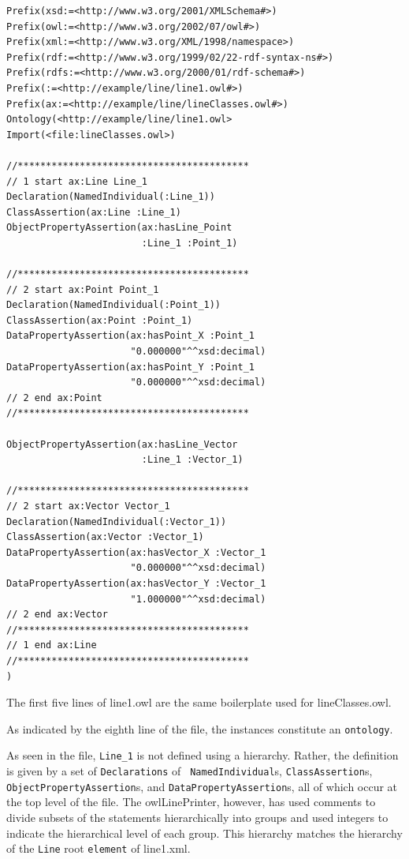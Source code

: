 \documentclass[preprint,12pt]{elsarticle}
\begin{document}
\begin{verbatim}
Prefix(xsd:=<http://www.w3.org/2001/XMLSchema#>)
Prefix(owl:=<http://www.w3.org/2002/07/owl#>)
Prefix(xml:=<http://www.w3.org/XML/1998/namespace>)
Prefix(rdf:=<http://www.w3.org/1999/02/22-rdf-syntax-ns#>)
Prefix(rdfs:=<http://www.w3.org/2000/01/rdf-schema#>)
Prefix(:=<http://example/line/line1.owl#>)
Prefix(ax:=<http://example/line/lineClasses.owl#>)
Ontology(<http://example/line/line1.owl>
Import(<file:lineClasses.owl>)

//*****************************************
// 1 start ax:Line Line_1
Declaration(NamedIndividual(:Line_1))
ClassAssertion(ax:Line :Line_1)
ObjectPropertyAssertion(ax:hasLine_Point
                        :Line_1 :Point_1)

//*****************************************
// 2 start ax:Point Point_1
Declaration(NamedIndividual(:Point_1))
ClassAssertion(ax:Point :Point_1)
DataPropertyAssertion(ax:hasPoint_X :Point_1
                      "0.000000"^^xsd:decimal)
DataPropertyAssertion(ax:hasPoint_Y :Point_1
                      "0.000000"^^xsd:decimal)
// 2 end ax:Point
//*****************************************

ObjectPropertyAssertion(ax:hasLine_Vector
                        :Line_1 :Vector_1)

//*****************************************
// 2 start ax:Vector Vector_1
Declaration(NamedIndividual(:Vector_1))
ClassAssertion(ax:Vector :Vector_1)
DataPropertyAssertion(ax:hasVector_X :Vector_1
                      "0.000000"^^xsd:decimal)
DataPropertyAssertion(ax:hasVector_Y :Vector_1
                      "1.000000"^^xsd:decimal)
// 2 end ax:Vector
//*****************************************
// 1 end ax:Line
//*****************************************
)
\end{verbatim}

The first five lines of line1.owl are the same boilerplate used for
lineClasses.owl.

As indicated by the eighth line of the file, the instances constitute an
{\tt ontology}.

As seen in the file, {\tt Line\_1} is not defined using a hierarchy.
Rather, the definition is given by a set of {\tt Declarations} of {\tt
  NamedIndividual}s, {\tt ClassAssertion}s, {\tt ObjectPropertyAssertion}s,
and {\tt DataPropertyAssertion}s, all of which occur at the top level of
the file. The owlLinePrinter, however, has used comments to divide subsets
of the statements hierarchically into groups and used integers to indicate
the hierarchical level of each group. This hierarchy matches the hierarchy
of the {\tt Line} root {\tt element} of line1.xml.
\end{document}
